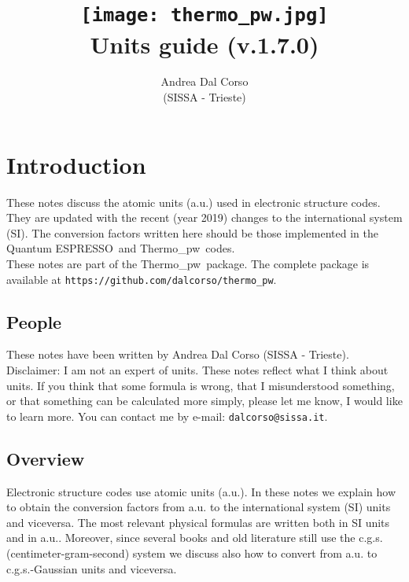 \documentclass[12pt,a4paper,twoside]{report}
\def\version{1.7.0}
\def\qe{{\sc Quantum ESPRESSO}}
\def\tpw{{\sc Thermo}\_{\sc pw}}
\begin{document}
 

\author{Andrea Dal Corso \\ (SISSA - Trieste)}
\date{}

\title{
  \texttt{[image: thermo\_pw.jpg]} \\
  \vspace{3truecm}
  \Huge \color{dark-blue} Units guide (v.\version)
}

\maketitle

\newpage

\color{dark-blue}
\tableofcontents
\color{black}

\newpage

{\color{dark-blue}\chapter{Introduction}}
\color{black}

These notes discuss the atomic units (a.u.) used in 
electronic structure codes. They are updated with the recent 
(year 2019) changes to the international system (SI).  
The conversion factors written here should be those implemented in
the \qe\ and \tpw\ codes. \\
These notes are part of the \tpw\ package. The complete package is
available at \texttt{https://github.com/dalcorso/thermo\_pw}.

\newpage
{\color{coral}\section{People}}
\color{black}
These notes have been written by Andrea Dal Corso (SISSA - Trieste). \\
Disclaimer: I am not an expert of units. 
These notes reflect what I think about units.
If you think that some formula is wrong, that I misunderstood something, or 
that something can be calculated more simply, please let me know, I would 
like to learn more. 
You can contact me by e-mail: \texttt{dalcorso@sissa.it}. 

\newpage
{\color{coral}\section{Overview}}
\color{black}
Electronic structure codes use atomic units (a.u.). 
In these notes we explain how to obtain the conversion factors 
from a.u. to the international system (SI) units and viceversa. 
The most relevant physical formulas are written both in SI units 
and in a.u.. Moreover, since several books and old literature still 
use the c.g.s. (centimeter-gram-second) system we discuss also how 
to convert from a.u. to c.g.s.-Gaussian units and viceversa.
\end{document}
